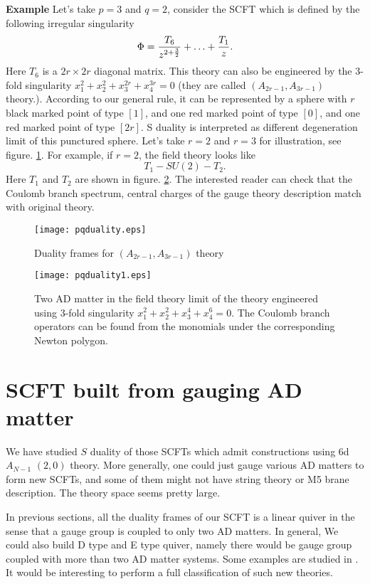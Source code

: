 \documentclass[a4paper,11pt]{article}
\begin{document}
\textbf{Example}
Let's take $p=3$ and $q=2$, consider the SCFT which is defined by the following irregular singularity 
\begin{equation}
\Phi={T_6\over z^{2+{3\over2}}}+\ldots+{T_1\over z}.
\end{equation}
Here $T_6$ is a $2r\times 2r$ diagonal matrix.  
This theory can also be engineered by the 3-fold singularity  $x_1^2+x_2^2+x_3^{2r}+x_4^{3r}=0$ (they are called $(A_{2r-1}, A_{3r-1})$ theory.).  
According to our general rule, it can be represented by a sphere with $r$ black marked point of type $[1]$, and 
one red marked point of type $[0]$, and one red marked point of type $[2r]$. 
S duality is interpreted as different degeneration limit of this punctured sphere. 
Let's take $r=2$ and $r=3$ for illustration, see figure. \ref{pqduality}.  For example, if $r=2$, the field theory looks like 
\begin{equation}
T_1-SU(2)-T_2.
\end{equation}
Here $T_1$ and $T_2$ are shown in figure. \ref{pqduality1}. The interested reader can check that the Coulomb branch spectrum, central charges of the gauge theory
description match with original theory. 

\begin{figure}[h]
\centering
  \texttt{[image: pqduality.eps]}
  \caption{Duality frames for $(A_{2r-1}, A_{3r-1})$ theory}
  \label{pqduality}
\end{figure}

\begin{figure}[h]
\centering
  \texttt{[image: pqduality1.eps]}
  \caption{Two AD matter in the field theory limit of the theory engineered using 3-fold singularity $x_1^2+x_2^2+x_3^4+x_4^6=0$. The Coulomb branch 
  operators can be found from the monomials under the corresponding Newton polygon.}
  \label{pqduality1}
\end{figure}
\newpage
\section{SCFT built from gauging AD matter}
We have studied $S$ duality of those SCFTs  which admit constructions using 6d $A_{N-1}$ $(2,0)$ theory. 
More generally, one could just gauge various AD matters to form new SCFTs, and some of them 
might not have string theory or M5 brane description. The theory space seems pretty large. 

In previous sections, all the duality frames of our SCFT is a linear quiver in the sense that a gauge group is coupled to only two AD matters. In general, 
We could also build D type and E type quiver, namely there would be gauge group coupled with 
more than two AD matter systems.  Some examples are studied in \cite{DelZotto:2015rca,Wang:2016yha}. It would be interesting 
to perform a full classification of such new theories. 
\end{document}
